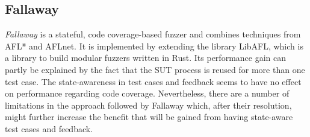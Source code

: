 \subsection{Fallaway}
\textit{Fallaway} \cite{Fallaway} is a stateful, code coverage-based fuzzer and combines techniques from AFL* and AFLnet. It is implemented by extending the library LibAFL, which is a library to build modular fuzzers written in Rust. Its performance gain can partly be explained by the fact that the SUT process is reused for more than one test case. The state-awareness in test cases and feedback seems to have no effect on performance regarding code coverage. Nevertheless, there are a number of limitations in the approach followed by Fallaway which, after their resolution, might further increase the benefit that will be gained from having state-aware test cases and feedback.

